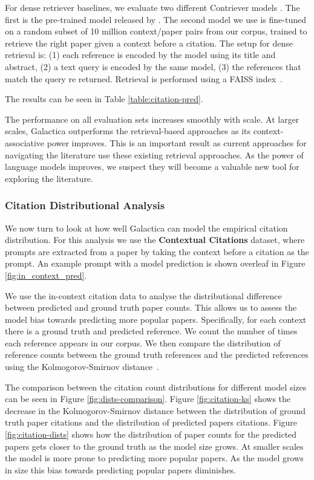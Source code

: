 {For dense retriever baselines, we evaluate two different Contriever models \citep{Contriever}. The first is the pre-trained model released by \citet{Contriever}. The second model we use is fine-tuned on a random subset of 10 million context/paper pairs from our corpus, trained to retrieve the right paper given a context before a citation. The setup for dense retrieval is: (1) each reference is encoded by the model using its title and abstract, (2) a text query is encoded by the same model, (3) the references that match the query re returned. Retrieval is performed using a FAISS index~\citep{FAISS}.

The results can be seen in Table \ref{table:citation-pred}.

The performance on all evaluation sets increases smoothly with scale. At larger scales, Galactica outperforms the retrieval-based approaches as its context-associative power improves. This is an important result as current approaches for navigating the literature use these existing retrieval approaches. As the power of language models improves, we suspect they will become a valuable new tool for exploring the literature.

\subsubsection{Citation Distributional Analysis}

We now turn to look at how well Galactica can model the empirical citation distribution. For this analysis we use the \textbf{Contextual Citations} dataset, where prompts are extracted from a paper by taking the context before a citation as the prompt. An example prompt with a model prediction is shown overleaf in Figure \ref{fig:in_context_pred}.

We use the in-context citation data to analyse the distributional difference between predicted and ground truth paper counts. This allows us to assess the model bias towards predicting more popular papers. Specifically, for each context there is a ground truth and predicted reference. We count the number of times each reference appears in our corpus. We then compare the distribution of reference counts between the ground truth references and the predicted references using the Kolmogorov-Smirnov distance~\citep{Massey_1951}.

The comparison between the citation count distributions for different model sizes can be seen in Figure \ref{fig:dists-comparison}. Figure \ref{fig:citation-ks} shows the decrease in the Kolmogorov-Smirnov distance between the distribution of ground truth paper citations and the distribution of predicted papers citations. Figure \ref{fig:citation-dists} shows how the distribution of paper counts for the predicted papers gets closer to the ground truth as the model size grows. At smaller scales the model is more prone to predicting more popular papers. As the model grows in size this bias towards predicting popular papers diminishes.

}
